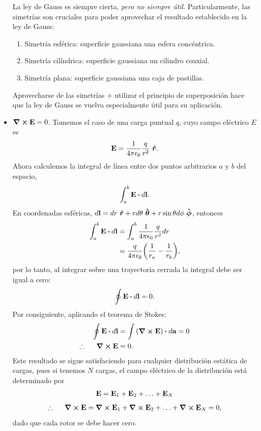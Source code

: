 \begin{itemize}
La ley de Gauss es siempre cierta, \textit{pero no siempre útil}.
Particularmente, las simetrías son cruciales para poder aprovechar 
el resultado establecido en la ley de Gauss:
\begin{enumerate}
\item Simetría esférica: superficie gaussiana una esfera concéntrica.
\item Simetría cilíndrica: superficie gaussiana un cilindro coaxial. 
\item Simetría plana: superficie gaussiana una caja de pastillas.
\end{enumerate}
Aprovecharse de las simetrías $+$ utilizar el principio de superposición
hace que la ley de Gauss se vuelva especialmente útil para su aplicación.

\item $\curl{\vb{E}}=0$. Tomemos el caso de una carga puntual
$q$, cuyo campo eléctrico $E$ es
\begin{align}
\vb{E}=\frac{1}{4\pi\epsilon_0}\frac{q}{r^2}\ \boldsymbol{\hat{r}}.
\end{align}
Ahora calculemos la integral de línea entre dos puntos arbitrarios
$a$ y $b$ del espacio, 
\begin{align*}
\int_a^b \vb{E}\vdot d\vb{l}.
\end{align*}
En coordenadas esféricas, $d\vb{l}=dr\ \boldsymbol{\hat{r}}
+rd\theta \ \boldsymbol{\hat{\boldsymbol{\theta}}}+
r\sin\theta d\phi \ \boldsymbol{\hat{\boldsymbol{\phi}}}$, entonces
\begin{align*}
\int_a^b\vb{E}\vdot d\vb{l}&=\int_a^b\frac{1}{4\pi\ep}\frac{q}{r^2}dr\\
&=\frac{q}{4\pi\ep}\qty(\frac{1}{r_a}-\frac{1}{r_b}),
\end{align*}
por lo tanto, al integrar sobre una trayectoria cerrada la integral 
debe ser igual a cero:
\begin{align}
\oint\vb{E}\vdot d\vb{l}=0.
\end{align}
Por consiguiente, aplicando el teorema de Stokes:
\begin{align}
\oint\vb{E}\vdot d\vb{l}&=\int \qty(\curl{\vb{E}})\vdot d\vb{a}=0\\
\therefore \hspace{5mm} \curl{\vb{E}}&=0.
\end{align}
Este resultado se sigue satisfaciendo para cualquier distribución 
estática de cargas, pues si tenemos $N$ cargas, el campo eléctrico
de la distribución está determinado por 
\begin{align*}
\vb{E}=\vb{E}_1+\vb{E}_2+\ldots+\vb{E}_N\\
\end{align*}
\begin{align}
\therefore \hspace{5mm} 
\curl{\vb{E}}=\curl{\vb{E}_1}+\curl{\vb{E}_2}+\ldots+
\curl{\vb{E}_N}=0,
\end{align}
dado que cada rotor se debe hacer cero.
\end{itemize}
